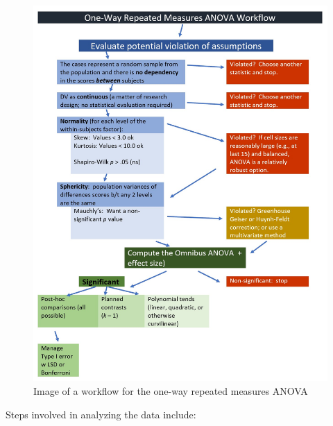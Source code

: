 \documentclass[
  11pt,
]{book}
\begin{document}
\begin{figure}
\centering
\includegraphics{images/oneway_repeated/wf_repeated.jpg}
\caption{Image of a workflow for the one-way repeated measures ANOVA}
\end{figure}

Steps involved in analyzing the data include:
\end{document}
